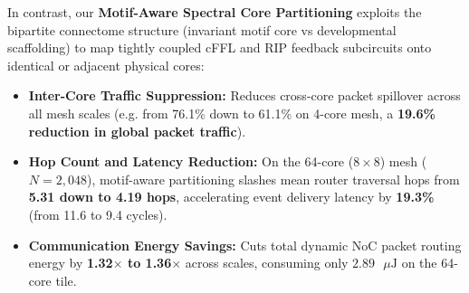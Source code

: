 \documentclass[11pt,letterpaper]{report}
\begin{document}
In contrast, our \textbf{Motif-Aware Spectral Core Partitioning} exploits the bipartite connectome structure (invariant motif core vs developmental scaffolding) to map tightly coupled cFFL and RIP feedback subcircuits onto identical or adjacent physical cores:
\begin{itemize}[leftmargin=*]
    \item \textbf{Inter-Core Traffic Suppression:} Reduces cross-core packet spillover across all mesh scales (e.g. from 76.1\% down to 61.1\% on 4-core mesh, a \textbf{19.6\% reduction in global packet traffic}).
    \item \textbf{Hop Count and Latency Reduction:} On the 64-core ($8\times 8$) mesh ($N = 2,048$), motif-aware partitioning slashes mean router traversal hops from \textbf{5.31 down to 4.19 hops}, accelerating event delivery latency by \textbf{19.3\%} (from 11.6 to 9.4 cycles).
    \item \textbf{Communication Energy Savings:} Cuts total dynamic NoC packet routing energy by \textbf{1.32$\times$ to 1.36$\times$} across scales, consuming only $2.89\text{ }\mu\text{J}$ on the 64-core tile.
\end{itemize}
\end{document}
